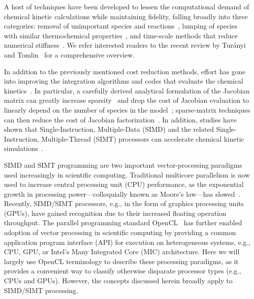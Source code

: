 \documentclass[12pt,number,sort&compress,preprint]{elsarticle}
\begin{document}
A host of techniques have been developed to lessen the computational demand of chemical kinetic calculations while maintaining fidelity, falling broadly into three categories: removal of unimportant species and reactions~\cite{Lu:2006bb,Pepiot-Desjardins:2008,Hiremath:2010jw,Niemeyer:2010bt,Curtis:2015},
lumping of species with similar thermochemical properties~\cite{Lu:2007,Ahmed:2007fa,Pepiot:2008kq},
and time-scale methods that reduce numerical stiffness~\cite{Maas:1992ws,Lam:1994ws,Lu:2001ve,Gou:2010}.
We refer interested readers to the recent review by Tur\'anyi and Tomlin~\cite{turanyi2016analysis} for a comprehensive overview.

In addition to the previously mentioned cost reduction methods, effort has gone into improving the integration algorithms and codes that evaluate the chemical kinetics~\cite{Gou:2010,SCHWER2002270,Niemeyer:2016aa,GAO2015287}.
In particular, a carefully derived analytical formulation of the Jacobian matrix can greatly increase sparsity~\cite{SCHWER2002270} and drop the cost of Jacobian evaluation to linearly depend on the number of species in the model~\cite{LU2009192}; sparse-matrix techniques can then reduce the cost of Jacobian factorization~\cite{superlu99}.
In addition, studies have shown that Single-Instruction, Multiple-Data (SIMD) and the related Single-Instruction, Multiple-Thread (SIMT) processors can accelerate chemical kinetic simulations~\cite{Shi:2012aa,Niemeyer:2014aa,Sewerin20151375,Niemeyer:2016aa,CurtisGPU:2017,stone2018}.

SIMD and SIMT programming are two important vector-processing paradigms used increasingly in scientific computing.
Traditional multicore parallelism is now used to increase central processing unit (CPU) performance, as the exponential growth in processing power---colloquially known as Moore's law---has slowed~\cite{khan2018science}.
Recently, SIMD\slash SIMT processors, e.g., in the form of graphics processing units (GPUs), have gained recognition due to their increased floating operation throughput.
The parallel programming standard OpenCL~\cite{stone2010opencl} has further enabled adoption of vector processing in scientific computing by providing a common application program interface (API) for execution on heterogeneous systems, e.g., CPU, GPU, or Intel's Many Integrated Core (MIC) architecture.
Here we will largely use OpenCL terminology to describe these processing paradigms, as it provides a convenient way to classify otherwise disparate processor types (e.g., CPUs and GPUs).
However, the concepts discussed herein broadly apply to SIMD\slash SIMT processing.
\end{document}
